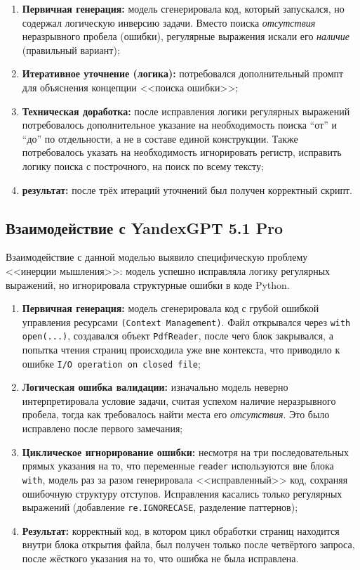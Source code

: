 \begin{enumerate}
    \item \textbf{Первичная генерация:} модель сгенерировала код, который запускался, но содержал логическую инверсию задачи. Вместо поиска \textit{отсутствия} неразрывного пробела (ошибки), регулярные выражения искали его \textit{наличие} (правильный вариант);
    \item \textbf{Итеративное уточнение (логика):} потребовался дополнительный промпт для объяснения концепции <<поиска ошибки>>;
    \item \textbf{Техническая доработка:} после исправления логики регулярных выражений потребовалось дополнительное указание на необходимость поиска ``от'' и ``до'' по отдельности, а не в составе единой конструкции. Также потребовалось указать на необходимость игнорировать регистр, исправить логику поиска с построчного, на поиск по всему тексту;
    \item \textbf{результат:} после трёх итераций уточнений был получен корректный скрипт.
\end{enumerate}

\subsection{Взаимодействие с YandexGPT 5.1 Pro}
Взаимодействие с данной моделью выявило специфическую проблему <<инерции мышления>>: модель успешно исправляла логику регулярных выражений, но игнорировала структурные ошибки в коде Python.

\begin{enumerate}
    \item \textbf{Первичная генерация:} модель сгенерировала код с грубой ошибкой управления ресурсами \texttt{(Context Management)}. Файл открывался через \texttt{with open(...)}, создавался объект \texttt{PdfReader}, после чего блок закрывался, а попытка чтения страниц происходила уже вне контекста, что приводило к ошибке \texttt{I/O operation on closed file};
    \item \textbf{Логическая ошибка валидации:} изначально модель неверно интерпретировала условие задачи, считая успехом наличие неразрывного пробела, тогда как требовалось найти места его \textit{отсутствия}. Это было исправлено после первого замечания;
    \item \textbf{Циклическое игнорирование ошибки:} несмотря на три последовательных прямых указания на то, что переменные \texttt{reader} используются вне блока \texttt{with}, модель раз за разом генерировала <<исправленный>> код, сохраняя ошибочную структуру отступов. Исправления касались только регулярных выражений (добавление \texttt{re.IGNORECASE}, разделение паттернов);
    \item \textbf{Результат:} корректный код, в котором цикл обработки страниц находится внутри блока открытия файла, был получен только после четвёртого запроса, после жёсткого указания на то, что ошибка не была исправлена.
\end{enumerate}

